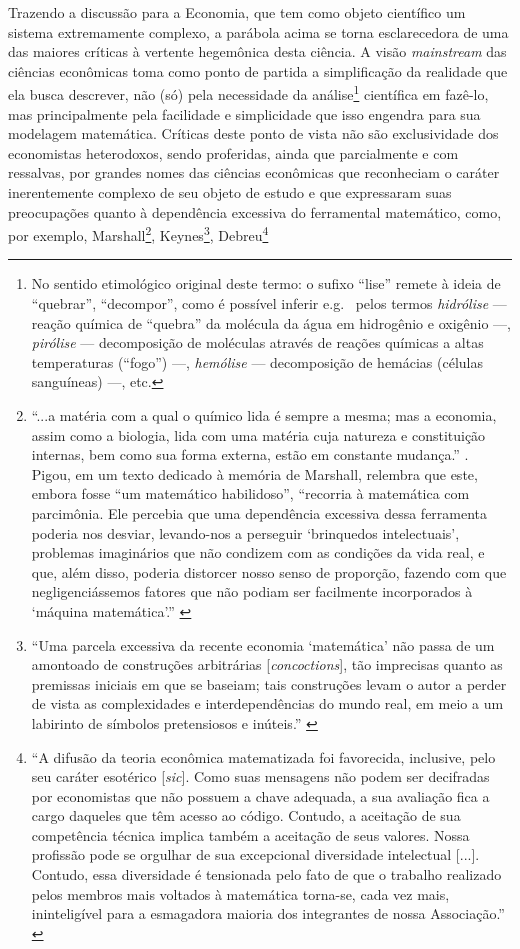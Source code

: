 Trazendo a discussão para a Economia, que tem como objeto científico um sistema extremamente complexo, a parábola acima se torna esclarecedora de uma das maiores críticas à vertente hegemônica desta ciência. A visão \textit{mainstream} das ciências econômicas toma como ponto de partida a simplificação da realidade que ela busca descrever, não (só) pela necessidade da análise\footnote{No sentido etimológico original deste termo: o sufixo ``lise'' remete à ideia de ``quebrar'', ``decompor'', como é possível inferir e.g.~ pelos termos \emph{hidrólise} --- reação química de ``quebra'' da molécula da água em hidrogênio e oxigênio ---, \emph{pirólise} --- decomposição de moléculas através de reações químicas a altas temperaturas (``fogo'') ---, \emph{hemólise} --- decomposição de hemácias (células sanguíneas) ---, etc.}  científica em fazê-lo, mas principalmente pela facilidade e simplicidade que isso engendra para sua modelagem matemática. Críticas deste ponto de vista não são exclusividade dos economistas heterodoxos, sendo proferidas, ainda que parcialmente e com ressalvas, por grandes nomes das ciências econômicas que reconheciam o caráter inerentemente complexo de seu objeto de estudo e que expressaram suas preocupações quanto à dependência excessiva do ferramental matemático, como, por exemplo, Marshall\footnote{``...a matéria com a qual o químico lida é sempre a mesma; mas a economia, assim como a biologia, lida com uma matéria cuja natureza e constituição internas, bem como sua forma externa, estão em constante mudança.'' \parencite[p. 449]{Marshall1920}. Pigou, em um texto dedicado à memória de Marshall, relembra que este, embora fosse ``um matemático habilidoso'', ``recorria à matemática com parcimônia. Ele percebia que uma dependência excessiva dessa ferramenta poderia nos desviar, levando-nos a perseguir `brinquedos intelectuais', problemas imaginários que não condizem com as condições da vida real, e que, além disso, poderia distorcer nosso senso de proporção, fazendo com que negligenciássemos fatores que não podiam ser facilmente incorporados à `máquina matemática'.'' \parencite[p. 84]{Pigou1925a}},
Keynes\footnote{``Uma parcela excessiva da recente economia `matemática' não passa de um amontoado de construções arbitrárias [\textit{concoctions}], tão imprecisas quanto as premissas iniciais em que se baseiam; tais construções levam o autor a perder de vista as complexidades e interdependências do mundo real, em meio a um labirinto de símbolos pretensiosos e inúteis.'' \parencite[Keynes \textit{apud}][p. 298]{vanDijck2015}}, 
Debreu\footnote{``A difusão da teoria econômica matematizada foi favorecida, inclusive, pelo seu caráter esotérico [\textit{sic}]. Como suas mensagens não podem ser decifradas por economistas que não possuem a chave adequada, a sua avaliação fica a cargo daqueles que têm acesso ao código. Contudo, a aceitação de sua competência técnica implica também a aceitação de seus valores. Nossa profissão pode se orgulhar de sua excepcional diversidade intelectual [...]. Contudo, essa diversidade é tensionada pelo fato de que o trabalho realizado pelos membros mais voltados à matemática torna-se, cada vez mais, ininteligível para a esmagadora maioria dos integrantes de nossa Associação.'' \parencite[p. 6]{Debreu1991}}

